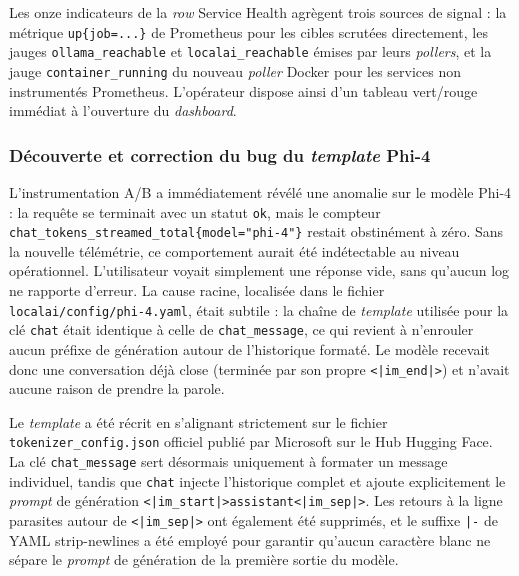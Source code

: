         Les onze indicateurs de la \textit{row} \og Service Health \fg{} agrègent
        trois sources de signal : la métrique \texttt{up\{job=...\}} de Prometheus
        pour les cibles scrutées directement, les jauges \texttt{ollama\_\allowbreak{}reachable}
        et \texttt{localai\_\allowbreak{}reachable} émises par leurs \textit{pollers}, et la jauge
        \texttt{container\_\allowbreak{}running} du nouveau \textit{poller} Docker pour les
        services non instrumentés Prometheus. L'opérateur dispose ainsi d'un tableau
        vert/rouge immédiat à l'ouverture du \textit{dashboard}.

        \subsubsection{Découverte et correction du bug du \textit{template} Phi-4}

        L'instrumentation A/B a immédiatement révélé une anomalie sur le modèle
        Phi-4 : la requête se terminait avec un statut \texttt{ok}, mais le compteur
        \texttt{chat\_\allowbreak{}tokens\_\allowbreak{}streamed\_\allowbreak{}total\{model="phi-4"\}} restait obstinément à
        zéro. Sans la nouvelle télémétrie, ce comportement aurait été indétectable
        au niveau opérationnel. L'utilisateur voyait simplement une réponse vide,
        sans qu'aucun log ne rapporte d'erreur. La cause racine, localisée dans le
        fichier \texttt{localai/\allowbreak{}config/\allowbreak{}phi-4.\allowbreak{}yaml}, était subtile : la chaîne de
        \textit{template} utilisée pour la clé \texttt{chat} était identique à celle
        de \texttt{chat\_\allowbreak{}message}, ce qui revient à n'enrouler aucun préfixe de
        génération autour de l'historique formaté. Le modèle recevait donc une
        conversation déjà close (terminée par son propre \texttt{<|im\_end|>}) et
        n'avait aucune raison de prendre la parole.

        Le \textit{template} a été récrit en s'alignant strictement sur le fichier
        \texttt{tokenizer\_\allowbreak{}config.\allowbreak{}json} officiel publié par Microsoft sur le Hub
        Hugging Face. La clé \texttt{chat\_\allowbreak{}message} sert désormais uniquement à
        formater un message individuel, tandis que \texttt{chat} injecte l'historique
        complet et ajoute explicitement le \textit{prompt} de génération
        \texttt{<|im\_\allowbreak{}start|>assistant<|im\_\allowbreak{}sep|>}. Les retours à la ligne parasites
        autour de \texttt{<|im\_sep|>} ont également été supprimés, et le suffixe
        \texttt{|-} de YAML strip-newlines a été employé pour garantir qu'aucun
        caractère blanc ne sépare le \textit{prompt} de génération de la première
        sortie du modèle.

